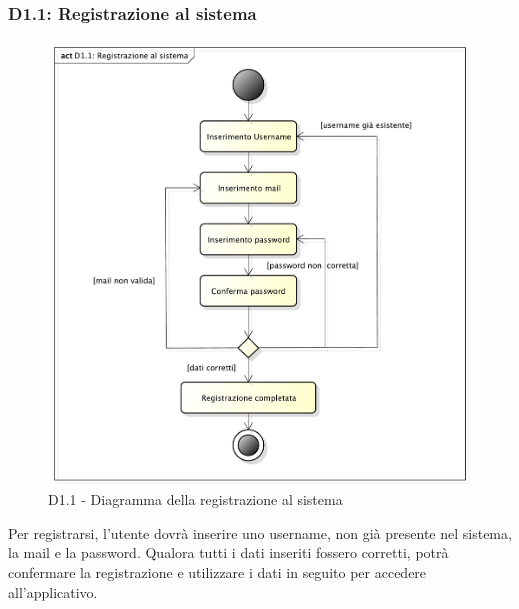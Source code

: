 		\subsubsection{D1.1: Registrazione al sistema} %
		\label{ssub:registrazione_al_sistema}
		\begin{figure}[!htbp]
			\centering
			\centerline{\includegraphics[scale=0.45]{./images/D1_1.pdf}}
			\caption{D1.1 - Diagramma della registrazione al sistema}
		\end{figure}
		\noindent
		Per registrarsi, l'utente dovrà inserire uno username, non già presente nel sistema, la mail e la password. Qualora tutti i dati inseriti fossero corretti, potrà confermare la registrazione e utilizzare i dati in seguito per accedere all'applicativo.

		\pagebreak

